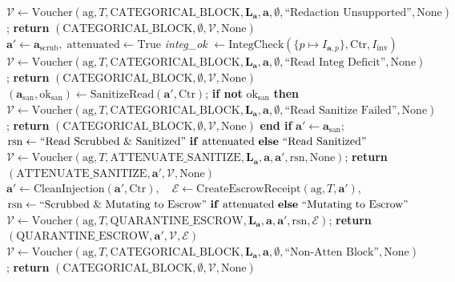 \documentclass[conference,10pt]{IEEEtran}
\begin{document}
\begin{algorithm*}[!t]
\begin{algorithmic}[1]
            \STATE $\mathcal{V} \leftarrow \text{Voucher}(\text{ag}, T, \text{CATEGORICAL\_BLOCK}, \mathbf{L}_{\mathbf{a}}, \mathbf{a}, \emptyset, \text{``Redaction Unsupported''}, \text{None})$; \quad \textbf{return} $(\text{CATEGORICAL\_BLOCK}, \emptyset, \mathcal{V}, \text{None})$
        \ENDIF
        \STATE $\mathbf{a}' \leftarrow \mathbf{a}_{\text{scrub}}, \; \text{attenuated} \leftarrow \text{True}$
    \ENDIF
\ENDIF
\STATE \textit{integ\_ok} $\leftarrow \text{IntegCheck}(\{p \mapsto I_{\mathbf{a}, p}\}, \text{Ctr}, I_{\text{inv}})$
            \STATE $\mathcal{V} \leftarrow \text{Voucher}(\text{ag}, T, \text{CATEGORICAL\_BLOCK}, \mathbf{L}_{\mathbf{a}}, \mathbf{a}, \emptyset, \text{``Read Integ Deficit''}, \text{None})$; \quad \textbf{return} $(\text{CATEGORICAL\_BLOCK}, \emptyset, \mathcal{V}, \text{None})$
        \ENDIF
        \STATE $(\mathbf{a}_{\text{san}}, \text{ok}_{\text{san}}) \leftarrow \text{SanitizeRead}(\mathbf{a}', \text{Ctr})$; \quad \textbf{if not} $\text{ok}_{\text{san}}$ \textbf{then} $\mathcal{V} \leftarrow \text{Voucher}(\text{ag}, T, \text{CATEGORICAL\_BLOCK}, \mathbf{L}_{\mathbf{a}}, \mathbf{a}, \emptyset, \text{``Read Sanitize Failed''}, \text{None})$; \textbf{return} $(\text{CATEGORICAL\_BLOCK}, \emptyset, \mathcal{V}, \text{None})$ \textbf{end if}
        \STATE $\mathbf{a}' \leftarrow \mathbf{a}_{\text{san}}$; \quad $\text{rsn} \leftarrow \text{``Read Scrubbed \& Sanitized''} \text{ \textbf{if} } \text{attenuated} \text{ \textbf{else} } \text{``Read Sanitized''}$
        \STATE $\mathcal{V} \leftarrow \text{Voucher}(\text{ag}, T, \text{ATTENUATE\_SANITIZE}, \mathbf{L}_{\mathbf{a}}, \mathbf{a}, \mathbf{a}', \text{rsn}, \text{None})$; \quad \textbf{return} $(\text{ATTENUATE\_SANITIZE}, \mathbf{a}', \mathcal{V}, \text{None})$
        \STATE $\mathbf{a}' \leftarrow \text{CleanInjection}(\mathbf{a}', \text{Ctr}), \quad \mathcal{E} \leftarrow \text{CreateEscrowReceipt}(\text{ag}, T, \mathbf{a}')$, \quad $\text{rsn} \leftarrow \text{``Scrubbed \& Mutating to Escrow''} \text{ \textbf{if} } \text{attenuated} \text{ \textbf{else} } \text{``Mutating to Escrow''}$
        \STATE $\mathcal{V} \leftarrow \text{Voucher}(\text{ag}, T, \text{QUARANTINE\_ESCROW}, \mathbf{L}_{\mathbf{a}}, \mathbf{a}, \mathbf{a}', \text{rsn}, \mathcal{E})$; \quad \textbf{return} $(\text{QUARANTINE\_ESCROW}, \mathbf{a}', \mathcal{V}, \mathcal{E})$
    \ELSE
        \STATE $\mathcal{V} \leftarrow \text{Voucher}(\text{ag}, T, \text{CATEGORICAL\_BLOCK}, \mathbf{L}_{\mathbf{a}}, \mathbf{a}, \emptyset, \text{``Non-Atten Block''}, \text{None})$; \quad \textbf{return} $(\text{CATEGORICAL\_BLOCK}, \emptyset, \mathcal{V}, \text{None})$

\end{algorithmic}
\end{algorithm*}
\end{document}
